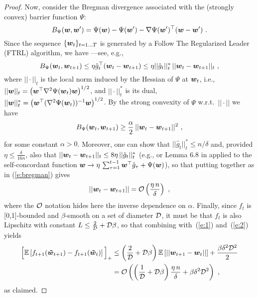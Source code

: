 \begin{proof}
Now, consider the Bregman divergence associated with the (strongly convex) barrier function $\Psi$:
\[
B_{\Psi}(\boldsymbol{w},\boldsymbol{w}') = \Psi(\boldsymbol{w})-\Psi(\boldsymbol{w}') -\nabla \Psi(\boldsymbol{w}')^\top(\boldsymbol{w}-\boldsymbol{w}')~.
\]
Since the sequence $\{\boldsymbol{w}_t\}_{t=1...T}$ is generated by a Follow The Regularized Leader (FTRL) algorithm, we have ---see, e.g., \citep[Equation~(5.2)]{hazan16}
%
\begin{equation}\label{e:bregman}
B_{\Psi}(\boldsymbol{w}_t,\boldsymbol{w}_{t+1}) \leq \eta{\hat g_t}^\top(\boldsymbol{w}_t-\boldsymbol{w}_{t+1}) \leq \eta ||{\hat g_t}||^*_t\,||\boldsymbol{w}_t-\boldsymbol{w}_{t+1}||_t~,
\end{equation}
%
where $||\cdot||_t$ is the local norm induced by the Hessian of $\Psi$ at $\boldsymbol{w}_t$, i.e., $||\boldsymbol{w}||_t = \big(\boldsymbol{w}^\top \nabla^2 \Psi (\boldsymbol{w}_t) \boldsymbol{w}\big)^{1/2}$, and $||\cdot||^*_t$ is its dual, $||\boldsymbol{w}||^*_t = \big(\boldsymbol{w}^\top (\nabla^2 \Psi (\boldsymbol{w}_t))^{-1} \boldsymbol{w}\big)^{1/2}$. By the strong convexity of $\Psi$ w.r.t.\ $||\cdot||$ we have
%
\[
B_{\Psi}(\boldsymbol{w}_t,\boldsymbol{w}_{t+1}) \geq \frac{\alpha}{2}\,||\boldsymbol{w}_t-\boldsymbol{w}_{t+1}||^2~,
\]
%
for some constant $\alpha > 0$. Moreover, one can show that $||{\hat g_t}||^*_t \leq n/\delta$ \citep{st11} and, provided $\eta \leq \frac{\delta}{16n}$, also that $||\boldsymbol{w}_t-\boldsymbol{w}_{t+1}||_t \leq 8\eta\,||{\hat g_t}||^*_t$ (e.g., \cite{ahr12} or Lemma 6.8 in \cite{hazan16} applied to the self-concordant function $\boldsymbol{w} \rightarrow \eta\,\sum_{\tau=1}^{t-1} \boldsymbol{w}^{\top}\hat g_{\tau} + \Psi(\boldsymbol{w})$), so that putting together as in (\ref{e:bregman}) gives
%
\begin{equation}\label{e:2}
||\boldsymbol{w}_t-\boldsymbol{w}_{t+1}|| = \mathcal{O}\left(\frac{\eta\,n}{\delta}\right)~,
\end{equation}
%
where the $\mathcal{O}$ notation hides here the inverse dependence on $\alpha$.
Finally, since $f_t$ is [0,1]-bounded and $\beta$-smooth on a set of diameter $\mathcal{D}$, it must be that $f_t$ is also Lipschitz with constant $L \leq \frac{2}{\mathcal{D}} + \mathcal{D}\beta$, so that combining with~(\ref{e:1}) and~(\ref{e:2}) yields
%
\begin{align*}
\Bigl[\mathbb{E}\left[f_{t+1}(\boldsymbol{{\tilde w}}_{t+1}) - f_{t+1}(\boldsymbol{{\tilde w}}_{t})\right] \Bigl]_+
&\leq \left(\frac{2}{\mathcal{D}} + \mathcal{D}\beta\right)\mathbb{E}\left[||\boldsymbol{w}_{t+1} -\boldsymbol{w}_{t}||\right]  + \frac{\beta\delta^2\mathcal{D}^2}{2}\\
&= \mathcal{O}\left(\left(\frac{1}{\mathcal{D}} + \mathcal{D}\beta\right)\frac{\eta\,n}{\delta}  + \beta\delta^2\mathcal{D}^2\right)~,
\end{align*}
%
as claimed.
\end{proof}
